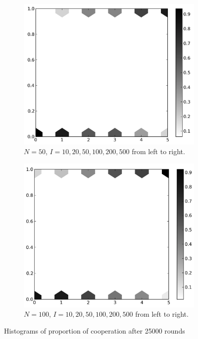\documentclass{amsart}
\begin{document}
\begin{figure}[h!tbp]
  \begin{subfigure}{.485\linewidth}
    \centering
    \includegraphics[width=\linewidth]{pop50iter.png}
    \caption{$N=50$,  $I = 10,20,50,100,200,500$ from left to
      right.}
    \label{fig:pop50iter}
  \end{subfigure}
  \hspace{.01\linewidth}
  \begin{subfigure}{.485\linewidth}
    \centering
    \includegraphics[width=\linewidth]{pop100iter.png}
    \caption{$N=100$,  $I = 10,20,50,100,200,500$ from left to
      right.}
    \label{fig:pop100iter}
  \end{subfigure}
  \caption{Histograms of proportion of cooperation after 25000 rounds}
\end{figure}
\end{document}
